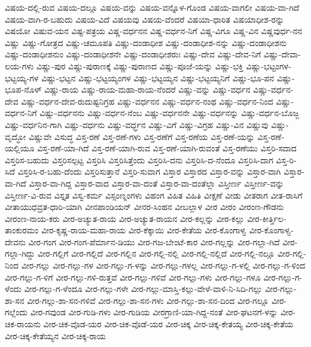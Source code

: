 ವಿಷಯ-ದಲ್ಲಿ-ರುವ
ವಿಷಯ-ದಲ್ಲೂ
ವಿಷಯ-ವನ್ನು
ವಿಷಯ-ವನ್ನೊಳ-ಗೊಂಡ
ವಿಷಯ-ವಾಗಲೀ
ವಿಷಯ-ವಾ-ಗಿದೆ
ವಿಷಯ-ವಾಗಿ-ರ-ಬಹುದು
ವಿಷಯ-ವಿದೆ
ವಿಷಯವು
ವಿಷಯ-ವೆಂದರೆ
ವಿಷಯಾ-ಧಾರಿತ
ವಿಷಯಾಧೀಶ-ರನ್ನು
ವಿಷಯೋ
ವಿಷುವ-ಯನ
ವಿಷ್ಟ-ಪತ್ರಯ
ವಿಷ್ಣ-ವರ್ಧನನ
ವಿಷ್ಣ-ವರ್ಧನ-ನಿಗೆ
ವಿಷ್ಣ-ವಿಗೂ
ವಿಷ್ಣ-ವಿನ
ವಿಷ್ಣವುರ್ಧ-ನನ
ವಿಷ್ಣು
ವಿಷ್ಣು-ಗೋತ್ರದ
ವಿಷ್ಣು-ಚಮೂಪತಿ
ವಿಷ್ಣು-ದಂಡಾಧೀಶ
ವಿಷ್ಣು-ದಂಡಾಧೀಶ-ನನ್ನು
ವಿಷ್ಣು-ದಂಡಾಧೀಶನು
ವಿಷ್ಣು-ದಂಡಾಧೀಶನುಂ
ವಿಷ್ಣು-ದಂಡಾಧೀಶನೇ
ವಿಷ್ಣು-ದಂಡಾಧೀಶರುಃ
ವಿಷ್ಣು-ದೇವ
ವಿಷ್ಣು-ದೇವ-ನಿಗೆ
ವಿಷ್ಣು-ದೇವಾ-ಲಯ-ಗಳು
ವಿಷ್ಣು-ಪುರ
ವಿಷ್ಣು-ಪುರಾಣಕ್ಕೆ
ವಿಷ್ಣು-ಪುರಾಣದ
ವಿಷ್ಣು-ಪೂಜೆ-ಯನ್ನು
ವಿಷ್ಣು-ಭಕ್ತಿ
ವಿಷ್ಣು-ಭಟ್ಟಂಗಳ-ಭಟ್ಟಯ್ಯ-ಗಳ
ವಿಷ್ಣು-ಭಟ್ಟನ
ವಿಷ್ಣು-ಭಟ್ಟಯ್ಯಂಗಳ
ವಿಷ್ಣು-ಭಟ್ಟಯ್ಯನ
ವಿಷ್ಣು-ಭಟ್ಟಯ್ಯನಿಗೆ
ವಿಷ್ಣು-ಭೂ-ಪನ
ವಿಷ್ಣು-ಭೂಪ-ನೊಳ್
ವಿಷ್ಣು-ರಾಯ
ವಿಷ್ಣು-ರಾಯ-ಮಹಾ-ರಾಯ-ನೆಂದರೆ
ವಿಷ್ಣು-ವನ್ನು
ವಿಷ್ಣು-ವರ್ಧನ
ವಿಷ್ಣು-ವರ್ಧನ-ದೇವ
ವಿಷ್ಣು-ವರ್ಧನ-ದೇವ-ರುದುಷ್ಟನಿಗ್ರಹ
ವಿಷ್ಣು-ವರ್ಧನನ
ವಿಷ್ಣು-ವರ್ಧನ-ನಂಥ
ವಿಷ್ಣು-ವರ್ಧನ-ನಿಂದ
ವಿಷ್ಣು-ವರ್ಧನ-ನಿಗೆ
ವಿಷ್ಣು-ವರ್ಧನನು
ವಿಷ್ಣು-ವರ್ಧನ-ನೆಂಬ
ವಿಷ್ಣು-ವರ್ಧನನೇ
ವಿಷ್ಣು-ವರ್ಧನನ್ನು
ವಿಷ್ಣು-ವರ್ಧನ-ಬೊಜ್ಜ
ವಿಷ್ಣು-ವರ್ಧನಿನ-ಗಾಗಿ
ವಿಷ್ಣು-ವರ್ಧನು
ವಿಷ್ಣು-ವರ್ಧ್ಧನ
ವಿಷ್ಣು-ವಿಗೆ
ವಿಷ್ಣು-ವಿಗ್ರಹ
ವಿಷ್ಣು-ವಿನ
ವಿಷ್ಣುವು
ವಿಷ್ಣು-ವೃದ್ಧೋ
ವಿಷ್ಣುವೇ
ವಿಸುದ್ಧ
ವಿಸ್ತ-ರಣೆ
ವಿಸ್ತ-ರಣೆ-ಗಳು
ವಿಸ್ತ-ರಣೆಗೆ
ವಿಸ್ತ-ರಣೆಯ
ವಿಸ್ತ-ರಣೆ-ಯನ್ನು
ವಿಸ್ತ-ರಣೆ-ಯಲ್ಲಿಯೂ
ವಿಸ್ತ-ರಣೆ-ಯಾ-ಗಿದೆ
ವಿಸ್ತ-ರಣೆ-ಯಾಗಿ-ರುವ
ವಿಸ್ತ-ರಣೆ-ಯಾಗಿ-ರುವಂತೆ
ವಿಸ್ತ-ರಣೆಯು
ವಿಸ್ತರಿ-ಸದಾದ
ವಿಸ್ತರಿಸ-ಬಹುದು
ವಿಸ್ತರಿಸಲ್ಪಟ್ಟ
ವಿಸ್ತರಿಸಿ
ವಿಸ್ತರಿಸಿತ್ತೆಂದು
ವಿಸ್ತರಿಸಿ-ದನು
ವಿಸ್ತರಿಸಿ-ದ-ನೆಂದೂ
ವಿಸ್ತರಿಸಿ-ದಾಗ
ವಿಸ್ತ-ರಿ-ಸಿದೆ
ವಿಸ್ತರಿಸಿ-ರ-ಬಹು-ದೆಂದು
ವಿಸ್ತರಿಸುತ್ತಾನೆ
ವಿಸ್ತರಿ-ಸುವಾಗ
ವಿಸ್ತಾರ
ವಿಸ್ತಾರದ
ವಿಸ್ತಾರ-ವನ್ನು
ವಿಸ್ತಾರ-ವಾಗಿ
ವಿಸ್ತಾರ-ವಾ-ಗಿದೆ
ವಿಸ್ತಾರ-ವಾ-ಗಿದ್ದ
ವಿಸ್ತಾರ-ವಾದ
ವಿಸ್ತಾರ-ವಾ-ದಂತೆ
ವಿಸ್ತಾರ-ವಾ-ದಂತೆಲ್ಲಾ
ವಿಸ್ತೀರ್ಣ
ವಿಸ್ತೀರ್ಣ-ವನ್ನು
ವಿಸ್ತೀರ್ಣ-ವಿ-ರುವ
ವಿಸ್ತೃತ
ವಿಸ್ವ-ಕರ್ಮ
ವಿಸ್ಸಂಣ್ನಂಗಳು
ವಿಹಂಗ
ವಿಹಿತ
ವಿಹಿತಿ
ವೀಕ್ಷಣೆ
ವೀಡು
ವೀತರಾಗ
ವೀತ-ರಾಸಿಗೆ
ವೀತಾಯುಧವ್ರತ-ಧಾರಿ-ಯಾಗಿ
ವೀನಪಾಂಡಿಯನ್
ವೀನರ-ಸಿಂಹನ
ವೀಬಲ್ಲಾಳ
ವೀರ
ವೀರಂ
ವೀರಂಣ-ಗೌಡನು
ವೀರಂಣ-ನಾಯ-ಕರು
ವೀರ-ಅಚ್ಯುತ-ರಾಯ
ವೀರ-ಅಚ್ಯುತ-ರಾಯನ
ವೀರ-ಕಲ್ಲನ್ನು
ವೀರ-ಕಲ್ಲು
ವೀರ-ಕೀರ್ತ್ತಿಲ-ತಾಂಕುರಮಂ
ವೀರ-ಕೃಷ್ಣ-ರಾಯ-ಮಹಾ-ರಾಯ
ವೀರ-ಕೆಕ್ಕಾಯಿ
ವೀರ-ಕೇತೆಯ
ವೀರ-ಕೊಂಗಾಳ್ವ
ವೀರ-ಕೊಂಗಾಳ್ವ-ದೇವನು
ವೀರ-ಗಂಗ
ವೀರ-ಗಂಗ-ಪೆರ್ಮಾನ-ಡಿಯು
ವೀರ-ಗಜ-ಬೇಂಟೆ-ಕಾರ
ವೀರ-ಗಲ್ಲನ್ನು
ವೀರ-ಗಲ್ಲಾ-ಗಿದೆ
ವೀರ-ಗಲ್ಲಾ-ಗಿದ್ದು
ವೀರ-ಗಲ್ಲಿಗೆ
ವೀರ-ಗಲ್ಲಿದೆ
ವೀರ-ಗಲ್ಲಿನ
ವೀರ-ಗಲ್ಲಿ-ನಲ್ಲಿ
ವೀರ-ಗಲ್ಲಿ-ನಲ್ಲಿದೆ
ವೀರ-ಗಲ್ಲಿ-ನಲ್ಲೂ
ವೀರ-ಗಲ್ಲಿ-ನಿಂದ
ವೀರ-ಗಲ್ಲು
ವೀರ-ಗಲ್ಲು-ಗಳ
ವೀರ-ಗಲ್ಲು-ಗ-ಳನ್ನು
ವೀರ-ಗಲ್ಲು-ಗಳಲ್ಲ
ವೀರ-ಗಲ್ಲು-ಗ-ಳಲ್ಲಿ
ವೀರ-ಗಲ್ಲು-ಗ-ಳಿಂದ
ವೀರ-ಗಲ್ಲು-ಗ-ಳಿಗೆ
ವೀರ-ಗಲ್ಲು-ಗಳಿ-ರುತ್ತವೆ
ವೀರ-ಗಲ್ಲು-ಗಳಿವೆ
ವೀರ-ಗಲ್ಲು-ಗಳು
ವೀರ-ಗಲ್ಲು-ಗಳೂ
ವೀರ-ಗಲ್ಲು-ಗ-ಳೆಂದು
ವೀರ-ಗಲ್ಲು-ಗ-ಳೆಂದೂ
ವೀರ-ಗಲ್ಲು-ಗಳೇ
ವೀರ-ಗಲ್ಲು-ಮಾಸ್ತಿ-ಕಲ್ಲು-ವೇಳೆ-ವಾಳಿ-ನಿ-ಸಿದಿ-ಗಲ್ಲು
ವೀರ-ಗಲ್ಲು-ಶಾ-ಸನ
ವೀರ-ಗಲ್ಲು-ಶಾ-ಸನ-ಗಳಿವೆ
ವೀರ-ಗಲ್ಲು-ಶಾ-ಸನ-ಗಳು
ವೀರ-ಗಲ್ಲು-ಶಾ-ಸನ-ದಿಂದ
ವೀರ-ಗಲ್ಲೂ
ವೀರ-ಗಲ್ಲೆಂದು
ವೀರ-ಗವುಂಡ
ವೀರ-ಗುಡಿ-ಗಳು
ವೀರ-ಗುಡಿಯ
ವೀರಗ್ರಾಣಿ-ಯಾ-ಗಿದ್ದ-ನಂತೆ
ವೀರ-ಘಟನಗೆ-ಳನ್ನು
ವೀರ-ಚಿಕ-ರಾಯನು
ವೀರ-ಚಿಕ-ವೊಡ-ಯರ
ವೀರ-ಚಿಕ-ವೊಡೆ-ಯರ
ವೀರ-ಚಿಕ್ಕ
ವೀರ-ಚಿಕ್ಕ-ಕೇತಯ್ಯ
ವೀರ-ಚಿಕ್ಕ-ಕೇತೆಯ
ವೀರ-ಚಿಕ್ಕ-ಕೇತೆಯ್ಯನ
ವೀರ-ಚಿಕ್ಕ-ರಾಯ
